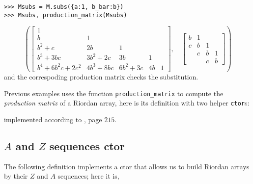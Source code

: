\begin{example}
\begin{verbatim}
>>> Msubs = M.subs({a:1, b_bar:b})
>>> Msubs, production_matrix(Msubs)
\end{verbatim}
\begin{displaymath}
\left ( \left[\begin{matrix}1 &   &   &   &  \\b & 1 &   &   &  \\b^{2} + c & 2 b & 1 &   &  \\b^{3} + 3 b c & 3 b^{2} + 2 c & 3 b & 1 &  \\b^{4} + 6 b^{2} c + 2 c^{2} & 4 b^{3} + 8 b c & 6 b^{2} + 3 c & 4 b & 1\end{matrix}\right], \quad \left[\begin{matrix}b & 1 &   &  \\c & b & 1 &  \\  & c & b & 1\\  &   & c & b\end{matrix}\right]\right )
\end{displaymath}
and the correspoding production matrix checks the substitution.
\end{example}

Previous examples uses the function \verb|production_matrix| to compute the
\textit{production matrix} \citep{DEUTSCH2005101,Deutsch2009} of a Riordan
array, here is its definition with two helper \verb|ctor|s:


implemented according to \citep{barry2017riordan}, page $215$.
\vfill

\subsection{$A$ and $Z$ sequences ctor}

The following definition implements a ctor that allows us to build Riordan
arrays by their $Z$ and $A$ sequences; here it is,


